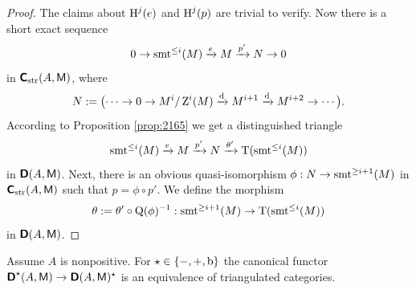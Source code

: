 \begin{proof}
The claims about $\operatorname{H}^j(e)$ and $\operatorname{H}^j(p)$ are trivial to verify. 
Now there is a short exact sequence 
\begin{equation} \label{eqn:3036}
0 \to \operatorname{smt}^{\leq i}(M) \xrightarrow{e} M \xrightarrow{p'} N \to 0 
\end{equation}
in $\boldsymbol{\mathsf{C}}_{\mathrm{str}}(A, \operatorname{\mathsf{M}})$, where 
\[ N := \bigl( \cdots \to 0 \to M^i / \operatorname{Z}^{i}(M) \xrightarrow{\mathrm{d}} M^{i+1} 
\xrightarrow{\mathrm{d}} M^{i+2} \to \cdots \bigr) . \]
According to Proposition \ref{prop:2165} we get a distinguished triangle 
\[ \operatorname{smt}^{\leq i}(M) \xrightarrow{e} M \xrightarrow{p'} N 
\xrightarrow{\theta'} \operatorname{T}(\operatorname{smt}^{\leq i}(M)) \]
in $\boldsymbol{\mathsf{D}}(A, \operatorname{\mathsf{M}})$. Next, there is an obvious quasi-isomorphism 
$\phi : N \to \operatorname{smt}^{\geq i + 1}(M)$
in $\boldsymbol{\mathsf{C}}_{\mathrm{str}}(A, \operatorname{\mathsf{M}})$
such that $p = \phi \circ p'$. We define the morphism 
\[ \theta := \theta' \circ \operatorname{Q}(\phi)^{-1} : \operatorname{smt}^{\geq i + 1}(M)
\to \operatorname{T}(\operatorname{smt}^{\leq i}(M)) \]
in $\boldsymbol{\mathsf{D}}(A, \operatorname{\mathsf{M}})$. 
\end{proof}

\begin{prop} \label{prop:1463}
Assume $A$ is nonpositive.
For $\star \in \{ -, +, \mathrm{b} \}$ the canonical functor
$\boldsymbol{\mathsf{D}}^{\star}(A, \operatorname{\mathsf{M}}) \to \boldsymbol{\mathsf{D}}(A, \operatorname{\mathsf{M}})^{\star}$ 
is an equivalence of triangulated categories. 
\end{prop}

